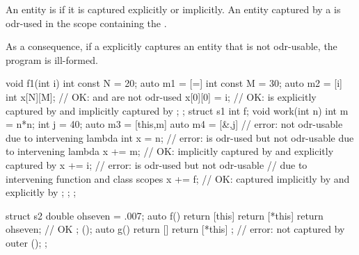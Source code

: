 \pnum
An entity is  if it is captured explicitly or implicitly. An entity
captured by a  is odr-used in the scope
containing the .
\begin{note}
As a consequence, if a 
explicitly captures an entity that is not odr-usable,
the program is ill-formed.
\end{note}
\begin{example}
%
\begin{codeblock}
void f1(int i) {
  int const N = 20;
  auto m1 = [=]{
    int const M = 30;
    auto m2 = [i]{
      int x[N][M];              // OK:  and  are not odr-used
      x[0][0] = i;              // OK:  is explicitly captured by  and implicitly captured by 
    };
  };
  struct s1 {
    int f;
    void work(int n) {
      int m = n*n;
      int j = 40;
      auto m3 = [this,m] {
        auto m4 = [&,j] {       // error:  not odr-usable due to intervening lambda 
          int x = n;            // error:  is odr-used but not odr-usable due to intervening lambda 
          x += m;               // OK:  implicitly captured by  and explicitly captured by 
          x += i;               // error:  is odr-used but not odr-usable
                                // due to intervening function and class scopes
          x += f;               // OK:  captured implicitly by  and explicitly by 
        };
      };
    }
  };
}

struct s2 {
  double ohseven = .007;
  auto f() {
    return [this] {
      return [*this] {
          return ohseven;       // OK
      };
    }();
  }
  auto g() {
    return [] {
      return [*this] { };       // error:  not captured by outer 
    }();
  }
};
\end{codeblock}
\end{example}

